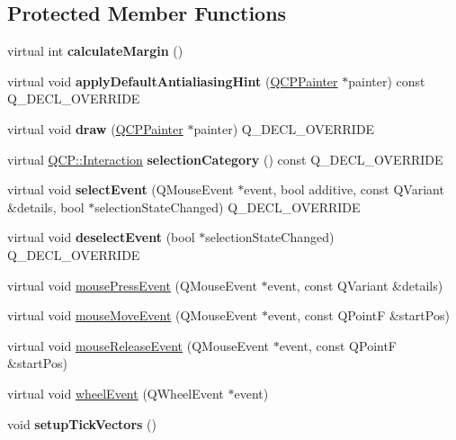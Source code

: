 \subsection*{Protected Member Functions}
\begin{DoxyCompactItemize}
\item 
virtual int {\bfseries calculate\+Margin} ()\hypertarget{classQCPAxis_a47bdb0a55de6759489ee47665199aebb}{}\label{classQCPAxis_a47bdb0a55de6759489ee47665199aebb}

\item 
virtual void {\bfseries apply\+Default\+Antialiasing\+Hint} (\hyperlink{classQCPPainter}{Q\+C\+P\+Painter} $\ast$painter) const Q\+\_\+\+D\+E\+C\+L\+\_\+\+O\+V\+E\+R\+R\+I\+DE\hypertarget{classQCPAxis_adbaeffcdc2707f2bd5dc1bbd11236770}{}\label{classQCPAxis_adbaeffcdc2707f2bd5dc1bbd11236770}

\item 
virtual void {\bfseries draw} (\hyperlink{classQCPPainter}{Q\+C\+P\+Painter} $\ast$painter) Q\+\_\+\+D\+E\+C\+L\+\_\+\+O\+V\+E\+R\+R\+I\+DE\hypertarget{classQCPAxis_ac15ebb4225ca5212d8e5fffae481bc9b}{}\label{classQCPAxis_ac15ebb4225ca5212d8e5fffae481bc9b}

\item 
virtual \hyperlink{namespaceQCP_a2ad6bb6281c7c2d593d4277b44c2b037}{Q\+C\+P\+::\+Interaction} {\bfseries selection\+Category} () const Q\+\_\+\+D\+E\+C\+L\+\_\+\+O\+V\+E\+R\+R\+I\+DE\hypertarget{classQCPAxis_ab751e3e96495716a2f6742ca7d7b3d49}{}\label{classQCPAxis_ab751e3e96495716a2f6742ca7d7b3d49}

\item 
virtual void {\bfseries select\+Event} (Q\+Mouse\+Event $\ast$event, bool additive, const Q\+Variant \&details, bool $\ast$selection\+State\+Changed) Q\+\_\+\+D\+E\+C\+L\+\_\+\+O\+V\+E\+R\+R\+I\+DE\hypertarget{classQCPAxis_a50c3ed18e189d48421ec2978f88e4f87}{}\label{classQCPAxis_a50c3ed18e189d48421ec2978f88e4f87}

\item 
virtual void {\bfseries deselect\+Event} (bool $\ast$selection\+State\+Changed) Q\+\_\+\+D\+E\+C\+L\+\_\+\+O\+V\+E\+R\+R\+I\+DE\hypertarget{classQCPAxis_a5bc1f8a8d0fbc7658eba70c80279ed31}{}\label{classQCPAxis_a5bc1f8a8d0fbc7658eba70c80279ed31}

\item 
virtual void \hyperlink{classQCPAxis_ac89c068873ee9197a5d2af715bdc1105}{mouse\+Press\+Event} (Q\+Mouse\+Event $\ast$event, const Q\+Variant \&details)
\item 
virtual void \hyperlink{classQCPAxis_a2a89a13440eec099fc2327c2672be0cd}{mouse\+Move\+Event} (Q\+Mouse\+Event $\ast$event, const Q\+PointF \&start\+Pos)
\item 
virtual void \hyperlink{classQCPAxis_a35663b938ad83e91c0b8e59dbc8c6b18}{mouse\+Release\+Event} (Q\+Mouse\+Event $\ast$event, const Q\+PointF \&start\+Pos)
\item 
virtual void \hyperlink{classQCPAxis_a71643d27524a843230b5ba68085b3d9b}{wheel\+Event} (Q\+Wheel\+Event $\ast$event)
\item 
void {\bfseries setup\+Tick\+Vectors} ()\hypertarget{classQCPAxis_a57d9e961bae7d62f5b4e1f143e660c78}{}\label{classQCPAxis_a57d9e961bae7d62f5b4e1f143e660c78}


\end{DoxyCompactItemize}
